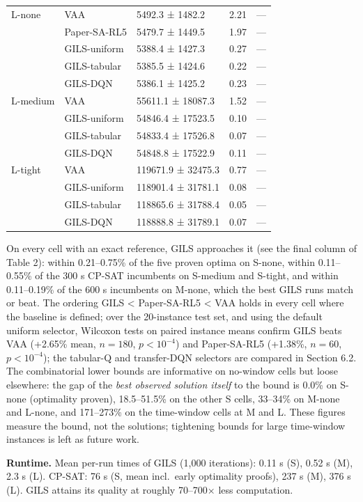 \documentclass[
]{article}
\newcounter{none} %
\begin{document}
{\begin{longtable}[]{@{}lllrr@{}}
L-none & VAA & 5492.3 ± 1482.2 & 2.21 & --- \\
& Paper-SA-RL5 & 5479.7 ± 1449.5 & 1.97 & --- \\
& GILS-uniform & 5388.4 ± 1427.3 & 0.27 & --- \\
& GILS-tabular & 5385.5 ± 1424.6 & 0.22 & --- \\
& GILS-DQN & 5386.1 ± 1425.2 & 0.23 & --- \\
L-medium & VAA & 55611.1 ± 18087.3 & 1.52 & --- \\
& GILS-uniform & 54846.4 ± 17523.5 & 0.10 & --- \\
& GILS-tabular & 54833.4 ± 17526.8 & 0.07 & --- \\
& GILS-DQN & 54848.8 ± 17522.9 & 0.11 & --- \\
L-tight & VAA & 119671.9 ± 32475.3 & 0.77 & --- \\
& GILS-uniform & 118901.4 ± 31781.1 & 0.08 & --- \\
& GILS-tabular & 118865.6 ± 31788.4 & 0.05 & --- \\
& GILS-DQN & 118888.8 ± 31789.1 & 0.07 & --- \\
\end{longtable}
}

On every cell with an exact reference, GILS approaches it (see the final
column of Table 2): within 0.21--0.75\% of the five proven optima on
S-none, within 0.11--0.55\% of the 300 s CP-SAT incumbents on S-medium
and S-tight, and within 0.11--0.19\% of the 600 s incumbents on M-none,
which the best GILS runs match or beat. The ordering GILS \textless{}
Paper-SA-RL5 \textless{} VAA holds in every cell where the baseline is
defined; over the 20-instance test set, and using the default uniform
selector, Wilcoxon tests on paired instance means confirm GILS beats VAA
(+2.65\% mean, \(n=180\), \(p<10^{-4}\)) and Paper-SA-RL5 (+1.38\%,
\(n=60\), \(p<10^{-4}\)); the tabular-Q and transfer-DQN selectors are
compared in Section 6.2. The combinatorial lower bounds are informative
on no-window cells but loose elsewhere: the gap of the \emph{best
observed solution itself} to the bound is 0.0\% on S-none (optimality
proven), 18.5--51.5\% on the other S cells, 33--34\% on M-none and
L-none, and 171--273\% on the time-window cells at M and L. These
figures measure the bound, not the solutions; tightening bounds for
large time-window instances is left as future work.

\textbf{Runtime.} Mean per-run times of GILS (1,000 iterations): 0.11 s
(S), 0.52 s (M), 2.3 s (L). CP-SAT: 76 s (S, mean incl.~early optimality
proofs), 237 s (M), 376 s (L). GILS attains its quality at roughly
70--700× less computation.
\end{document}
